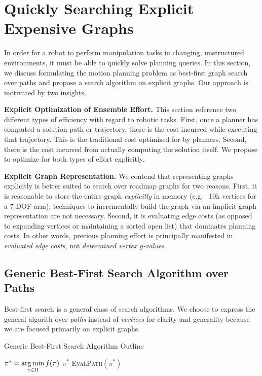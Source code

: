 \clearpage
\section{Quickly Searching Explicit Expensive Graphs}
\label{chap:e8}

In order for a robot to perform manipulation tasks
in changing, unstructured environments,
it must be able to quickly solve planning queries.
In this section,
we discuss formulating
the motion planning problem as best-first graph search over paths
and propose a search algorithm on explicit graphs.
Our approach is motivated by two insights.

\textbf{Explicit Optimization of Ensemble Effort.}
This section reference two different types of efficiency
with regard to robotic tasks.
First, once a planner has computed a solution path or trajectory,
there is the cost incurred while executing that trajectory.
This is the traditional cost optimized for by planners.
Second, there is the cost incurred from actually computing the solution
itself.
We propose to optimize for both types of effort explicitly.

\textbf{Explicit Graph Representation.}
We contend that representing graphs explicitly
is better suited to search over roadmap graphs
for two reasons.
First, it is reasonable to store the entire graph
\emph{explicitly} in memory
(e.g. ~10k vertices for a 7-DOF arm);
techniques to incrementally build the graph
via an implicit graph representation
are not necessary.
Second,
it is evaluating edge costs
(as opposed to expanding vertices or maintaining
a sorted open list)
that dominates planning costs.
In other words,
precious planning effort is principally manifested in
\emph{evaluated edge costs},
not \emph{determined vertex $g$-values}.

\subsection{Generic Best-First Search Algorithm over Paths}

Best-first search\cite{winston1977ai}
is a general class of search algorithms.
We choose to express the general algorith
over \emph{paths} instead of \emph{vertices}
for clarity and generality
because we are focused primarily on explicit graphs.
\begin{algorithm}
   \caption{Generic Best-First Search Algorithm Outline}
   \label{alg:generic-best-first}
   \begin{algorithmic}[1]
   \Loop
      \State $\pi^* = \operatorname*{arg\,min}\limits_{\pi \in \Pi} f(\pi)$
         \label{line:generic-select-optimistic-path}
         \State \Return $\pi^*$
      \EndIf
      \State \textsc{EvalPath}$(\pi^*)$
   \EndLoop
   \EndProcedure
   \end{algorithmic}
\end{algorithm}

